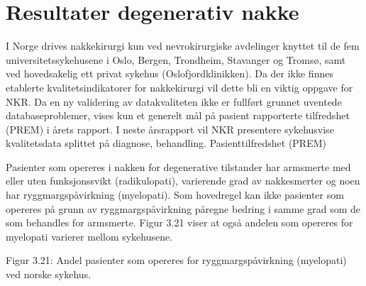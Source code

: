 \documentclass{article}\usepackage[]{graphicx}\usepackage[]{color}
\begin{document}
\section{Resultater degenerativ nakke}

I Norge drives nakkekirurgi kun ved nevrokirurgiske avdelinger knyttet til de fem
universitetssykehusene i Oslo, Bergen, Trondheim, Stavanger og Tromsø, samt ved
hovedsakelig ett privat sykehus (Oslofjordklinikken).
Da der ikke finnes etablerte kvalitetsindikatorer for nakkekirurgi vil dette bli en
viktig oppgave for NKR. Da en ny validering av datakvaliteten ikke er fullført grunnet
uventede databaseproblemer, vises kun et generelt mål på pasient rapporterte
tilfredshet (PREM) i årets rapport. I neste årsrapport vil NKR presentere sykehusvise
kvalitetsdata splittet på diagnose, behandling.
Pasienttilfredshet (PREM)




Pasienter som opereres i nakken for degenerative tilstander har armsmerte med
eller uten funksjonssvikt (radikulopati), varierende grad av nakkesmerter og noen
har ryggmargspåvirkning (myelopati). Som hovedregel kan ikke pasienter som
opereres på grunn av ryggmargspåvirkning påregne bedring i samme grad som de
som behandles for armsmerte. Figur 3.21 viser at også andelen som opereres for
myelopati varierer mellom sykehusene.

Figur 3.21: Andel pasienter som opereres for ryggmargspåvirkning (myelopati) ved
norske sykehus.
\end{document}
